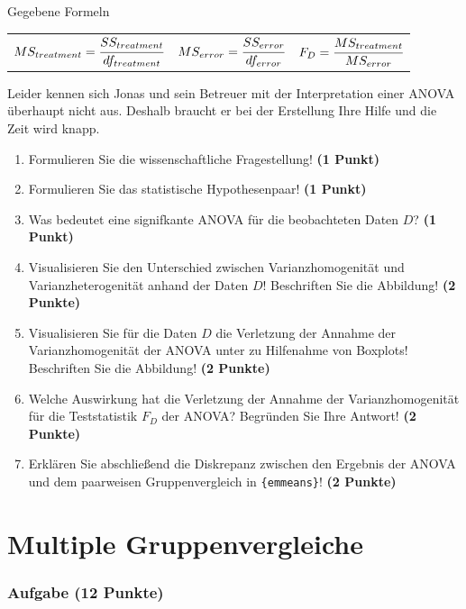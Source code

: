 \documentclass[a4paper, 9pt]{scrartcl}\usepackage[]{graphicx}\usepackage[]{xcolor}
\begin{document}
\begin{graybox}{Gegebene Formeln}
\begin{center}
  \begin{tabular}{ccc}
    $MS_{treatment} = \cfrac{SS_{treatment}}{df_{treatment}}$ &
    $MS_{error} = \cfrac{SS_{error}}{df_{error}}$ &
    $F_{D} = \cfrac{MS_{treatment}}{MS_{error}}$ \\
  \end{tabular}
\end{center}
\end{graybox}

Leider kennen sich Jonas und sein Betreuer mit der Interpretation einer ANOVA überhaupt nicht aus. Deshalb braucht er bei der Erstellung Ihre Hilfe und die Zeit wird knapp. 

\begin{enumerate}
  \item Formulieren Sie die wissenschaftliche Fragestellung! \textbf{(1 Punkt)}
  \item Formulieren Sie das statistische Hypothesenpaar! \textbf{(1 Punkt)}
\item Was bedeutet eine signifkante ANOVA für die beobachteten Daten $D$? \textbf{(1 Punkt)}
\item Visualisieren Sie den Unterschied zwischen Varianzhomogenität und Varianzheterogenität anhand der Daten $D$! Beschriften Sie die Abbildung! \textbf{(2 Punkte)} 
\item Visualisieren Sie für die Daten $D$ die Verletzung der Annahme der Varianzhomogenität der ANOVA unter zu Hilfenahme von Boxplots! Beschriften Sie die Abbildung! \textbf{(2 Punkte)}
\item Welche Auswirkung hat die Verletzung der Annahme der Varianzhomogenität für die Teststatistik $F_D$ der ANOVA? Begründen Sie Ihre Antwort! \textbf{(2 Punkte)}
\item Erklären Sie abschließend die Diskrepanz zwischen den Ergebnis der ANOVA und dem paarweisen Gruppenvergleich in \texttt{\{emmeans\}}! \textbf{(2 Punkte)}
\end{enumerate}

 
\clearpage
\part{Multiple Gruppenvergleiche}

\section{Aufgabe \hfill (12 Punkte)}
\end{document}
